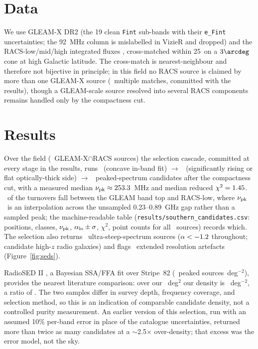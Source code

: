 \documentclass[twocolumn]{aastex631}
\newcommand{\code}[1]{\texttt{#1}}
\newcommand{\nupk}{\ensuremath{\nu_{\rm pk}}}
\newcommand{\alo}{\ensuremath{\alpha_{\rm lo}}}
\begin{document}
\section{Data}
We use GLEAM-X DR2 \citep{rossdr2} (the 19 clean \code{Fint} sub-bands with their
\code{e\_Fint} uncertainties; the 92~MHz column is mislabelled in VizieR and dropped) and the
RACS-low/mid/high integrated fluxes \citep{racshale2021,racsmid2024,racshigh2025}, cross-matched
within 25\arcsec\ on a $3\arcdeg$ cone at high Galactic latitude. The cross-match is
nearest-neighbour and therefore not bijective in principle; in this field no RACS source is
claimed by more than one GLEAM-X source (\soRealNracsMulti\ multiple matches, committed with the
results), though a GLEAM-scale source resolved into several RACS components remains handled only
by the compactness cut.

\section{Results}
Over the field (\soRealNmatched\ GLEAM-X$\cap$RACS sources) the selection cascade, committed at
every stage in the results, runs \soRealNpeakedNaive\ (concave in-band fit) $\to$
\soRealNpeakedRising\ (significantly rising or flat optically-thick side) $\to$ \soRealNpeaked\
peaked-spectrum candidates after the compactness cut, with a measured median
$\nupk\approx\soRealMedianNupk$~MHz and median reduced $\chi^2=1.45$.
\soRealGapFrac\ of the turnovers fall between the GLEAM band top and RACS-low, where \nupk\ is an
interpolation across the unsampled 0.23--0.89~GHz gap rather than a sampled peak; the
machine-readable table (\code{results/southern\_candidates.csv}: positions, classes, \nupk,
$\alo\pm\sigma$, $\chi^2$, point counts for all \soRealNmatched\ sources) records which. The
selection also returns \soRealNuss\ ultra-steep-spectrum sources ($\alpha<-1.2$ throughout;
candidate high-$z$ radio galaxies) and flags \soRealNextended\ extended resolution artefacts
(Figure~\ref{fig:seds}).

RadioSED II \citep{kerrison2025}, a Bayesian SSA/FFA fit over Stripe~82
(\soRealKerrisonDensity\ peaked sources~deg$^{-2}$), provides the nearest literature comparison:
over our \soRealArea~deg$^2$ our density is \soRealDensity~deg$^{-2}$, a ratio of
\soRealDensityRatio. The two samples differ in survey depth, frequency coverage, and selection
method, so this is an indication of comparable candidate density, not a controlled purity
measurement. An earlier version of this selection, run with an assumed 10\% per-band error in
place of the catalogue uncertainties, returned more than twice as many candidates at a
$\sim$2.5$\times$ over-density; that excess was the error model, not the sky.
\end{document}
